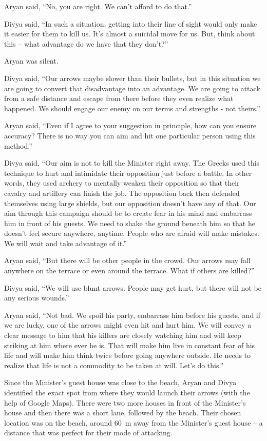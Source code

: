 Aryan said, “No, you are right. We can't afford to do that.”

Divya said, “In such a situation, getting into their line of sight would only
make it easier for them to kill us. It's almost a suicidal move for us. But,
think about this – what advantage do we have that they don't?”

Aryan was silent.

Divya said, “Our arrows maybe slower than their bullets, but in this situation
we are going to convert that disadvantage into an advantage. We are going to
attack from a safe distance and escape from there before they even realize what
happened. We should engage our enemy on our terms and strengths - not theirs.”

Aryan said, “Even if I agree to your suggestion in principle, how can you ensure
accuracy? There is no way you can aim and hit one particular person using this
method.”

Divya said, “Our aim is not to kill the Minister right away. The Greeks used
this technique to hurt and intimidate their opposition just before a battle. In
other words, they used archery to mentally weaken their opposition so that their
cavalry and artillery can finish the job. The opposition back then defended
themselves using large shields, but our opposition doesn't have any of that. Our
aim through this campaign should be to create fear in his mind and embarrass him
in front of his guests. We need to shake the ground beneath him so that he
doesn't feel secure anywhere, anytime. People who are afraid will make mistakes.
We will wait and take advantage of it.”

Aryan said, “But there will be other people in the crowd. Our arrows may fall
anywhere on the terrace or even around the terrace. What if others are killed?”

Divya said, “We will use blunt arrows. People may get hurt, but there will not
be any serious wounds.”

Aryan said, “Not bad. We spoil his party, embarrass him before his guests, and
if we are lucky, one of the arrows might even hit and hurt him. We will convey a
clear message to him that his killers are closely watching him and will keep
striking at him where ever he is. That will make him live in constant fear of
his life and will make him think twice before going anywhere outside. He needs to
realize that life is not a commodity to be taken at will. Let's do this.”

Since the Minister's guest house was close to the beach, Aryan and Divya
identified the exact spot from where they would launch their arrows (with the
help of Google Maps). There were two more houses in front of the Minister's
house and then there was a short lane, followed by the beach. Their chosen
location was on the beach, around 60 m away from the Minister's guest house – a
distance that was perfect for their mode of attacking.

